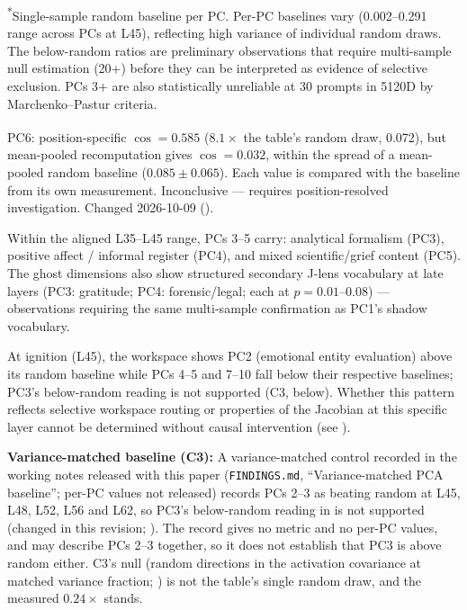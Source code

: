 \documentclass[11pt,a4paper]{article}
\begin{document}
\begin{table}[H]
\vspace{4pt}
\raggedright
{\scriptsize \textsuperscript{*}Single-sample random baseline per PC. Per-PC baselines vary (0.002--0.291 range across PCs at L45), reflecting high variance of individual random draws. The below-random ratios are preliminary observations that require multi-sample null estimation (20+) before they can be interpreted as evidence of selective exclusion. PCs 3+ are also statistically unreliable at 30 prompts in 5120D by Marchenko--Pastur criteria.}

\vspace{2pt}
{\scriptsize \textsuperscript{\dag}PC6: position-specific $\cos = 0.585$ ($8.1\times$ the table's random draw, 0.072), but mean-pooled recomputation gives $\cos = 0.032$, within the spread of a mean-pooled random baseline ($0.085 \pm 0.065$). Each value is compared with the baseline from its own measurement. Inconclusive --- requires position-resolved investigation. Changed 2026-10-09 ().}\par{}
\end{table}

Within the aligned L35--L45 range, PCs 3--5 carry: analytical formalism (PC3), positive affect / informal register (PC4), and mixed scientific/grief content (PC5). The ghost dimensions also show structured secondary J-lens vocabulary at late layers (PC3: gratitude; PC4: forensic/legal; each at $p = 0.01$--$0.08$) --- observations requiring the same multi-sample confirmation as PC1's shadow vocabulary.

At ignition (L45), the workspace shows PC2 (emotional entity evaluation) above its random baseline while PCs 4--5 and 7--10 fall below their respective baselines; PC3's below-random reading is not supported (C3, below). Whether this pattern reflects selective workspace routing or properties of the Jacobian at this specific layer cannot be determined without causal intervention (see ).\par \textbf{Variance-matched baseline (C3):} A variance-matched control recorded in the working notes released with this paper (\texttt{FINDINGS.md}, ``Variance-matched PCA baseline''; per-PC values not released) records PCs 2--3 as beating random at L45, L48, L52, L56 and L62, so PC3's below-random reading in  is not supported (changed in this revision; ). The record gives no metric and no per-PC values, and may describe PCs 2--3 together, so it does not establish that PC3 is above random either. C3's null (random directions in the activation covariance at matched variance fraction; ) is not the table's single random draw, and the measured $0.24\times$ stands.
\end{document}
